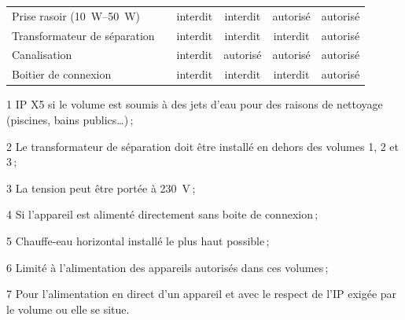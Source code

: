 \begin{table}[t]
\begin{threeparttable}
\begin{tabularx}{\linewidth}{X ccccc}
\addlinespace
Prise rasoir (\SIrange{10}{50}{\watt})								& \adjustbox{valign=t}{\makecell[{{p{2,5cm}}}]{transformateur de séparation}}															& interdit						& interdit 						& autorisé						& autorisé \\
\addlinespace
Transformateur de séparation							& 															& interdit						& interdit 						& interdit						& autorisé \\
\addlinespace
Canalisation							& 															& interdit						& autorisé\tnote{6} 						& autorisé\tnote{6}						& autorisé \\
\addlinespace
Boitier de connexion							& 															& interdit						& interdit\tnote{7} 						& interdit						& autorisé \\
\bottomrule
\end{tabularx}
\begin{tablenotes}
    \item[1] IP X5 si le volume est soumis à des jets d'eau pour des raisons de nettoyage (piscines, bains publics\ldots)\,;
    \item[2] Le transformateur de séparation doit être installé en dehors des volumes 1, 2 et 3\,;
	\item[3] La tension peut être portée à \SI{230}{\volt}\,;
	\item[4] Si l'appareil est alimenté directement sans boite de connexion\,;
	\item[5] Chauffe-eau horizontal installé le plus haut possible\,;
	\item[6] Limité à l'alimentation des appareils autorisés dans ces volumes\,;
	\item[7] Pour l'alimentation en direct d'un appareil et avec le respect de l'IP exigée par le volume ou elle se situe.
\end{tablenotes}
\end{threeparttable} %
\end{table}


%
